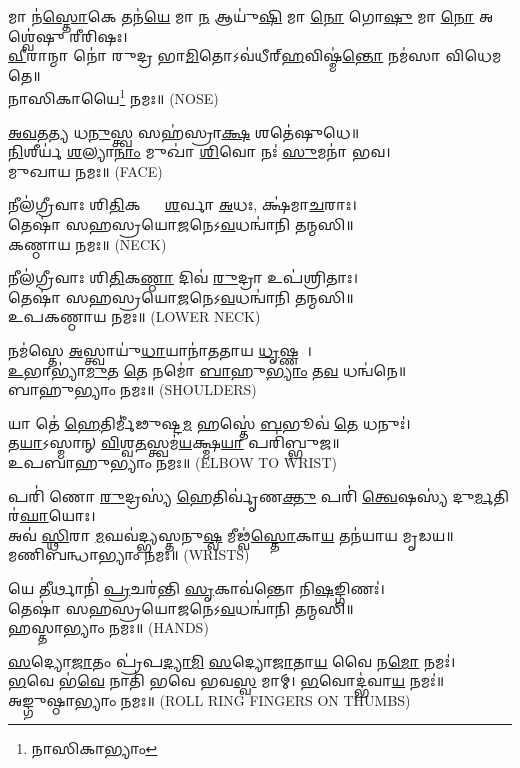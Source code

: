 𑌮𑌾 𑌨॑\ul{𑌸𑍍𑌤𑍋}𑌕𑍇 𑌤𑌨॑\ul{𑌯𑍇} 𑌮𑌾 \ul{𑌨} 𑌆𑌯𑍁॑\ul{𑌷𑌿} 𑌮𑌾 \ul{𑌨𑍋} 𑌗𑍋\ul{𑌷𑍁} 𑌮𑌾 \ul{𑌨𑍋} 𑌅𑌶𑍍𑌵𑍇॑𑌷𑍁 𑌰𑍀𑌰𑌿𑌷𑌃।\\
 \ul{𑌵𑍀}𑌰𑌾𑌨𑍍𑌮𑌾 𑌨𑍋॑ 𑌰𑍁𑌦𑍍𑌰 𑌭𑌾\ul{𑌮𑌿}𑌤𑍋𑌽𑌵॑𑌧𑍀𑌰𑍍‌\ul{𑌹}𑌵𑌿𑌷𑍍𑌮॑\ul{𑌨𑍍𑌤𑍋} 𑌨𑌮॑𑌸𑌾 𑌵𑌿𑌧𑍇𑌮 𑌤𑍇॥ \\
𑌨𑌾𑌸𑌿𑌕𑌾𑌯𑍈\footnote{𑌨𑌾𑌸𑌿𑌕𑌾𑌭𑍍𑌯𑌾𑌂} 𑌨𑌮𑌃॥ {\scriptsize (NOSE)}

\ul{𑌅}\ul{𑌵}𑌤\ul{𑌤𑍍𑌯} 𑌧\ul{𑌨𑍁}𑌸𑍍𑌤𑍍𑌵 𑌸𑌹॑𑌸𑍍𑌰𑌾\ul{𑌕𑍍𑌷} 𑌶𑌤𑍇॑𑌷𑍁𑌧𑍇॥\\
 \ul{𑌨𑌿}𑌶𑍀𑌰𑍍𑌯॑ \ul{𑌶}𑌲𑍍𑌯𑌾\ul{𑌨𑌾𑌂} 𑌮𑍁𑌖𑌾॑ \ul{𑌶𑌿}𑌵𑍋 𑌨𑌃॑ \ul{𑌸𑍁}𑌮𑌨𑌾॑ 𑌭𑌵।\\
𑌮𑍁𑌖𑌾𑌯 𑌨𑌮𑌃॥ {\scriptsize (FACE)}

 𑌨𑍀𑌲॑𑌗𑍍𑌰𑍀𑌵𑌾𑌃 𑌶𑌿\ul{𑌤𑌿}𑌕𑌣𑍍𑌠𑌾𑌃᳚ \ul{𑌶}𑌰𑍍𑌵𑌾 \ul{𑌅}𑌧𑌃, 𑌕𑍍𑌷॑𑌮𑌾\ul{𑌚}𑌰𑌾𑌃।\\
 𑌤𑍇𑌷𑌾॑ 𑌸𑌹𑌸𑍍𑌰𑌯𑍋\ul{𑌜}𑌨𑍇𑌽\ul{𑌵}𑌧𑌨𑍍𑌵𑌾॑𑌨𑌿 𑌤𑌨𑍍𑌮𑌸𑌿॥\\
𑌕𑌣𑍍𑌠𑌾𑌯 𑌨𑌮𑌃॥ {\scriptsize (NECK)}

𑌨𑍀𑌲॑𑌗𑍍𑌰𑍀𑌵𑌾𑌃 𑌶𑌿\ul{𑌤𑌿}𑌕\ul{𑌣𑍍𑌠𑌾} 𑌦𑌿𑌵॑ \ul{𑌰𑍁}𑌦𑍍𑌰𑌾 𑌉𑌪॑𑌶𑍍𑌰𑌿𑌤𑌾𑌃।\\
 𑌤𑍇𑌷𑌾॑ 𑌸𑌹𑌸𑍍𑌰𑌯𑍋\ul{𑌜}𑌨𑍇𑌽\ul{𑌵}𑌧𑌨𑍍𑌵𑌾॑𑌨𑌿 𑌤𑌨𑍍𑌮𑌸𑌿॥\\
𑌉𑌪𑌕𑌣𑍍𑌠𑌾𑌯 𑌨𑌮𑌃॥ {\scriptsize (LOWER NECK)}

𑌨𑌮॑𑌸𑍍𑌤𑍇 \ul{𑌅}𑌸𑍍𑌤𑍍𑌵𑌾𑌯𑍁॑\ul{𑌧𑌾}𑌯𑌾𑌨𑌾॑𑌤𑌤𑌾𑌯 \ul{𑌧𑍃}𑌷𑍍𑌣𑌵𑍇᳚।\\
 \ul{𑌉}𑌭𑌾𑌭𑍍𑌯𑌾॑\ul{𑌮𑍁}𑌤 \ul{𑌤𑍇} 𑌨𑌮𑍋॑ \ul{𑌬𑌾}𑌹𑍁\ul{𑌭𑍍𑌯𑌾𑌂} 𑌤\ul{𑌵} 𑌧𑌨𑍍𑌵॑𑌨𑍇॥\\
𑌬𑌾𑌹𑍁𑌭𑍍𑌯𑌾𑌂 𑌨𑌮𑌃॥ {\scriptsize (SHOULDERS)}


 𑌯𑌾 𑌤𑍇॑ \ul{𑌹𑍇}𑌤𑌿𑌰𑍍𑌮𑍀॑𑌢𑍁𑌷𑍍𑌟\ul{𑌮} 𑌹𑌸𑍍𑌤𑍇॑ \ul{𑌬}𑌭𑍂𑌵॑ \ul{𑌤𑍇} 𑌧𑌨𑍁𑌃॑।\\
 𑌤\ul{𑌯𑌾}𑌽𑌸𑍍𑌮𑌾𑌨𑍍 \ul{𑌵𑌿}𑌶𑍍𑌵\ul{𑌤}𑌸𑍍𑌤𑍍𑌵𑌮॑\ul{𑌯}𑌕𑍍𑌷𑍍𑌮\ul{𑌯𑌾} 𑌪𑌰𑌿॑𑌬𑍍𑌭𑍁𑌜॥\\
𑌉𑌪𑌬𑌾𑌹𑍁𑌭𑍍𑌯𑌾𑌂 𑌨𑌮𑌃॥ {\scriptsize (ELBOW TO WRIST)}

𑌪𑌰𑌿॑ 𑌣𑍋 \ul{𑌰𑍁}𑌦𑍍𑌰𑌸𑍍𑌯॑ \ul{𑌹𑍇}𑌤𑌿𑌰𑍍𑌵𑍃॑𑌣\ul{𑌕𑍍𑌤𑍁} 𑌪𑌰𑌿॑ \ul{𑌤𑍍𑌵𑍇}𑌷𑌸𑍍𑌯॑ 𑌦𑍁\ul{𑌰𑍍𑌮}𑌤𑌿𑌰॑\ul{𑌘𑌾}𑌯𑍋𑌃।\\
 𑌅𑌵॑ \ul{𑌸𑍍𑌥𑌿}𑌰𑌾 \ul{𑌮}𑌘𑌵॑𑌦𑍍𑌭𑍍𑌯𑌸𑍍𑌤𑌨𑍁\ul{𑌷𑍍𑌵} 𑌮𑍀𑌢𑍍𑌵॑\ul{𑌸𑍍𑌤𑍋}𑌕𑌾\ul{𑌯} 𑌤𑌨॑𑌯𑌾𑌯 𑌮𑍃𑌡𑌯॥\\
𑌮𑌣𑌿𑌬𑌨𑍍𑌧𑌾𑌭𑍍𑌯𑌾𑌂 𑌨𑌮𑌃॥ {\scriptsize (WRISTS)}

 𑌯𑍇 \ul{𑌤𑍀}𑌰𑍍𑌥𑌾𑌨𑌿॑ \ul{𑌪𑍍𑌰}𑌚𑌰॑𑌨𑍍𑌤𑌿 \ul{𑌸𑍃}𑌕𑌾𑌵॑𑌨𑍍𑌤𑍋 𑌨𑌿\ul{𑌷}𑌙𑍍𑌗𑌿𑌣𑌃॑।\\
 𑌤𑍇𑌷𑌾॑ 𑌸𑌹𑌸𑍍𑌰𑌯𑍋\ul{𑌜}𑌨𑍇𑌽\ul{𑌵}𑌧𑌨𑍍𑌵𑌾॑𑌨𑌿 𑌤𑌨𑍍𑌮𑌸𑌿॥\\
𑌹𑌸𑍍𑌤𑌾𑌭𑍍𑌯𑌾𑌂 𑌨𑌮𑌃॥ {\scriptsize (HANDS)}


\ul{𑌸}𑌦𑍍𑌯𑍋\ul{𑌜𑌾}𑌤𑌂 𑌪𑍍𑌰॑𑌪\ul{𑌦𑍍𑌯𑌾}\ul{𑌮𑌿} \ul{𑌸}𑌦𑍍𑌯𑍋\ul{𑌜𑌾}𑌤𑌾\ul{𑌯} 𑌵𑍈 𑌨\ul{𑌮𑍋} 𑌨𑌮𑌃॑।\\
\ul{𑌭}𑌵𑍇 𑌭॑\ul{𑌵𑍇} 𑌨𑌾𑌤𑌿॑ 𑌭𑌵𑍇 𑌭𑌵\ul{𑌸𑍍𑌵} 𑌮𑌾𑌮𑍍। \ul{𑌭}𑌵𑍋𑌦𑍍𑌭॑𑌵𑌾\ul{𑌯} 𑌨𑌮𑌃॑॥ \\
𑌅𑌙𑍍𑌗𑍁𑌷𑍍𑌠𑌾𑌭𑍍𑌯𑌾𑌂 𑌨𑌮𑌃॥ {\scriptsize (ROLL RING FINGERS ON THUMBS)}


